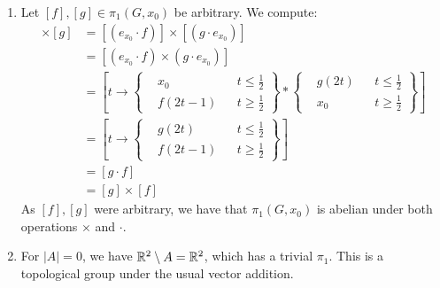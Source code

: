 \documentclass[12pt]{article}
\begin{document}
\begin{solution}
\begin{enumerate}
\begin{align*}
\begin{aligned}
                &g(2t-1) && t \geq \frac{1}{2}
            \end{aligned}
            \right\} \\
            &= \left\{ \begin{aligned}
                &f(2t) && t \leq \frac{1}{2} \\
                &g(2t-1) && t \geq \frac{1}{2}
            \end{aligned}
            \right\} \\
            &= f \cdot g
        \end{align*}
        Thus, we have:
        \[ [f \times g] = [(f \cdot e_{x_0}) \times (e_{x_0} \cdot g)] = [f \cdot g]\]
        Thus, 
        \[ [f] \times [g] = [f] \cdot [g]\]
        and the two operations agree on $\pi_1(G, x_0)$.        
        \item Let $[f], [g] \in \pi_1(G, x_0)$ be arbitrary. We compute:
        \begin{align*}
            [f] \times [g] &= [(e_{x_0} \cdot f)] \times [(g \cdot e_{x_0})] \\
            &= [(e_{x_0} \cdot f) \times (g \cdot e_{x_0})] \\
            &= \left[ t \to\left\{
            \begin{aligned}
                &x_0 && t \leq \frac{1}{2} \\
                &f(2t-1) && t \geq \frac{1}{2}
            \end{aligned}
            \right\}\ast \left\{
            \begin{aligned}
                &g(2t) && t \leq \frac{1}{2} \\
                &x_0 && t \geq \frac{1}{2}
            \end{aligned}
            \right\} \right] \\
            &= \left[ t \to \left\{
            \begin{aligned}
                &g(2t) && t \leq \frac{1}{2} \\
                &f(2t-1) && t \geq \frac{1}{2}
            \end{aligned}
            \right\} \right] \\
            &= [g \cdot f] \\
            &= [g] \times [f]
        \end{align*} 
        As $[f], [g]$ were arbitrary, we have that $\pi_1(G, x_0)$ is abelian under both operations $\times$ and $\cdot$.
        \item For $|A| = 0$, we have $\mathbb R^2\setminus A = \mathbb R^2$, which has a trivial $\pi_1$. This is a topological group under the usual vector addition. \bbni

\end{enumerate}
\end{solution}
\end{document}
